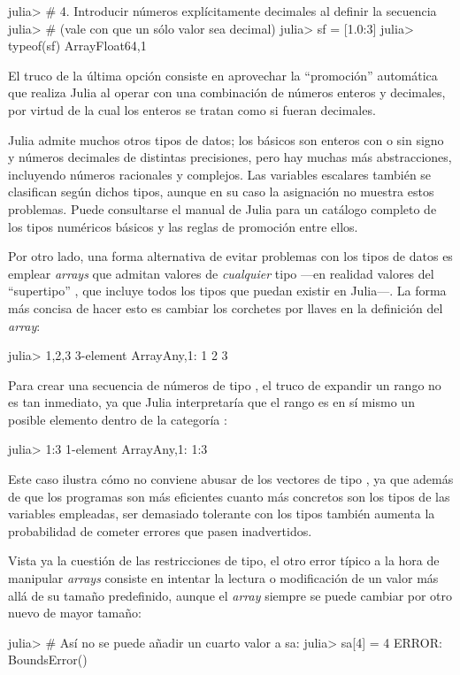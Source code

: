 ﻿\documentclass[spanish]{article}
\begin{document}
julia> # 4. Introducir números explícitamente decimales al definir la secuencia
julia> # (vale con que un sólo valor sea decimal)
julia> sf = [1.0:3]
julia> typeof(sf)
Array{Float64,1}

El truco de la última opción consiste en aprovechar la ``promoción'' automática que realiza Julia al operar con una combinación de números enteros y decimales, por virtud de la cual los enteros se tratan como si fueran decimales.

Julia admite muchos otros tipos de datos; los básicos son enteros con o sin signo y números decimales de distintas precisiones, pero hay muchas más abstracciones, incluyendo números racionales y complejos. Las variables escalares también se clasifican según dichos tipos, aunque en su caso la asignación no muestra estos problemas. Puede consultarse el manual de Julia para un catálogo completo de los tipos numéricos básicos y las reglas de promoción entre ellos.

Por otro lado, una forma alternativa de evitar problemas con los tipos de datos es emplear \emph{arrays} que admitan valores de \emph{cualquier} tipo ---en realidad valores del ``supertipo'' , que incluye todos los tipos que puedan existir en Julia---. La forma más concisa de hacer esto es cambiar los corchetes por llaves en la definición del \emph{array}:

julia> {1,2,3}
3-element Array{Any,1}:
 1
 2
 3

Para crear una secuencia de números de tipo , el truco de expandir un rango no es tan inmediato, ya que Julia interpretaría que el rango es en sí mismo un posible elemento dentro de la categoría :

julia> {1:3}
1-element Array{Any,1}:
 1:3

Este caso ilustra cómo no conviene abusar de los vectores de tipo , ya que además de que los programas son más eficientes cuanto más concretos son los tipos de las variables empleadas, ser demasiado tolerante con los tipos también aumenta la probabilidad de cometer errores que pasen inadvertidos.

Vista ya la cuestión de las restricciones de tipo, el otro error típico a la hora de manipular \emph{arrays} consiste en intentar la lectura o modificación de un valor más allá de su tamaño predefinido, aunque el \emph{array} siempre se puede cambiar por otro nuevo de mayor tamaño:

julia> # Así no se puede añadir un cuarto valor a sa:
julia> sa[4] = 4
ERROR: BoundsError()
\end{document}
